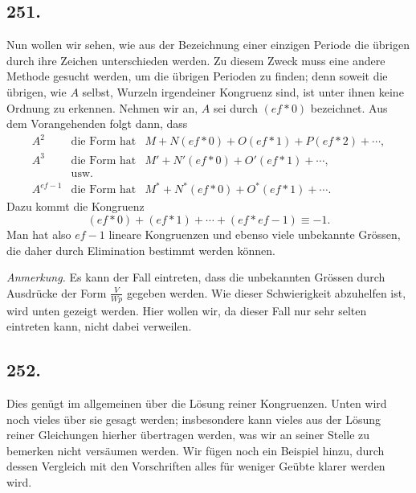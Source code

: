 \documentclass[12pt]{article}
\begin{document}
\subsection*{251.}
Nun wollen wir sehen, wie aus der Bezeichnung einer einzigen Periode die übrigen durch ihre Zeichen unterschieden werden. Zu diesem Zweck muss eine andere Methode gesucht werden, um die übrigen Perioden zu finden; denn soweit die übrigen, wie $A$ selbst, Wurzeln irgendeiner Kongruenz sind, ist unter ihnen keine Ordnung zu erkennen. Nehmen wir an, $A$ sei durch $(ef*0)$ bezeichnet. Aus dem Vorangehenden folgt dann, dass
\[
\begin{array}{rcl}
A^2&\text{die Form hat}&M+N(ef*0)+O(ef*1)+P(ef*2)+\cdots,\\
A^3&\text{die Form hat}&M'+N'(ef*0)+O'(ef*1)+\cdots,\\
&\text{usw.}&\\
A^{ef-1}&\text{die Form hat}&M^*+N^*(ef*0)+O^*(ef*1)+\cdots.
\end{array}
\]
Dazu kommt die Kongruenz
\[
(ef*0)+(ef*1)+\cdots+(ef*ef-1)\equiv -1.
\]
Man hat also $ef-1$ lineare Kongruenzen und ebenso viele unbekannte Grössen, die daher durch Elimination bestimmt werden können.

\textit{Anmerkung.} Es kann der Fall eintreten, dass die unbekannten Grössen durch Ausdrücke der Form $\frac{V}{Wp}$ gegeben werden. Wie dieser Schwierigkeit abzuhelfen ist, wird unten gezeigt werden. Hier wollen wir, da dieser Fall nur sehr selten eintreten kann, nicht dabei verweilen.

\subsection*{252.}
Dies genügt im allgemeinen über die Lösung reiner Kongruenzen. Unten wird noch vieles über sie gesagt werden; insbesondere kann vieles aus der Lösung reiner Gleichungen hierher übertragen werden, was wir an seiner Stelle zu bemerken nicht versäumen werden. Wir fügen noch ein Beispiel hinzu, durch dessen Vergleich mit den Vorschriften alles für weniger Geübte klarer werden wird.
\end{document}
